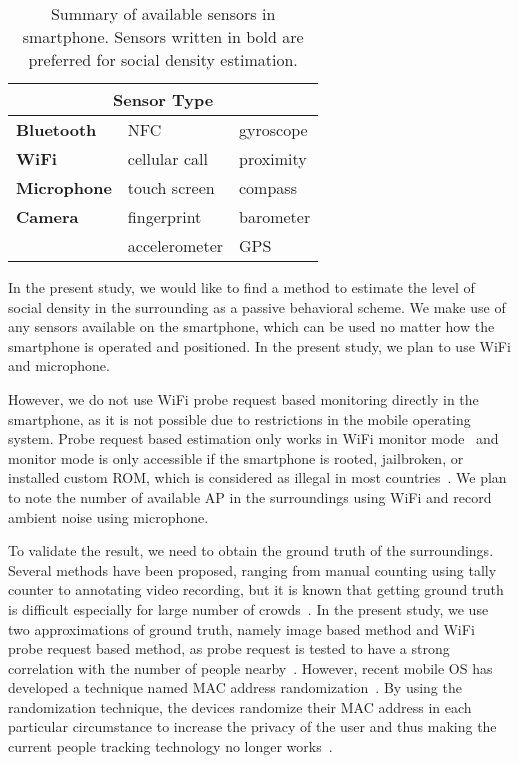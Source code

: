 \begin{table}[]
\centering
\caption{Summary of available sensors in smartphone. Sensors written in bold are preferred for social density estimation.}
\label{tab:smartphone-sensor-summary}
\begin{tabular}{lll}
\toprule
\multicolumn{3}{c}{Sensor Type} \\ \midrule
\textbf{Bluetooth}   & \ac{NFC}                    & gyroscope \\
\textbf{WiFi}        & cellular call               & proximity \\
\textbf{Microphone}  & touch screen                & compass \\
\textbf{Camera}      & fingerprint                 & barometer \\
                     & accelerometer               & \ac{GPS} \\
\bottomrule
\end{tabular}
\end{table}

In the present study, we would like to find a method to estimate the level of social density in the surrounding as a passive behavioral scheme. We make use of any sensors available on the smartphone, which can be used no matter how the smartphone is operated and positioned. In the present study, we plan to use WiFi and microphone.

However, we do not use WiFi probe request based monitoring directly in the smartphone, as it is not possible due to restrictions in the mobile operating system. Probe request based estimation only works in WiFi monitor mode~\cite{thesis052,thesis079} and monitor mode is only accessible if the smartphone is rooted, jailbroken, or installed custom \ac{ROM}, which is considered as illegal in most countries~\cite{rootjailbreak}. We plan to note the number of available \ac{AP} in the surroundings using WiFi and record ambient noise using microphone.


To validate the result, we need to obtain the ground truth of the surroundings. Several methods have been proposed, ranging from manual counting using tally  counter to annotating video recording, but it is known that getting ground truth is difficult especially for large number of crowds~\cite{thesis006}. In the present study, we use two approximations of ground truth, namely image based method and WiFi probe request based method, as probe request is tested to have a strong correlation with the number of people nearby~\cite{thesis047}. However, recent mobile \ac{OS} has developed a technique named \ac{MAC} address randomization~\cite{thesis062,thesis061}. By using the randomization technique, the devices randomize their \ac{MAC} address in each particular circumstance to increase the privacy of the user and thus making the current people tracking technology no longer works~\cite{thesis079}.


